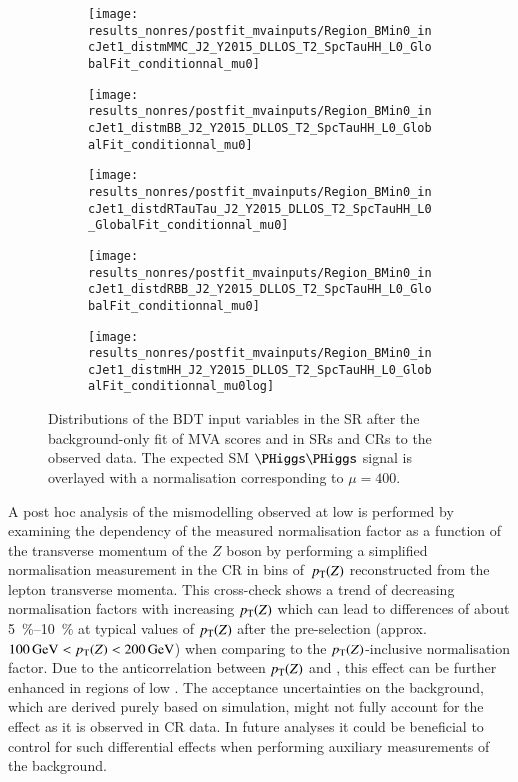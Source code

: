 \begin{figure}[htbp]
  \centering

  \begin{subfigure}{0.46\textwidth}
    \texttt{[image: results\_nonres/postfit\_mvainputs/Region\_BMin0\_incJet1\_distmMMC\_J2\_Y2015\_DLLOS\_T2\_SpcTauHH\_L0\_GlobalFit\_conditionnal\_mu0]}
  \end{subfigure}\hfill%
  \begin{subfigure}{0.46\textwidth}
    \texttt{[image: results\_nonres/postfit\_mvainputs/Region\_BMin0\_incJet1\_distmBB\_J2\_Y2015\_DLLOS\_T2\_SpcTauHH\_L0\_GlobalFit\_conditionnal\_mu0]}
  \end{subfigure}

  \begin{subfigure}{0.46\textwidth}
    \texttt{[image: results\_nonres/postfit\_mvainputs/Region\_BMin0\_incJet1\_distdRTauTau\_J2\_Y2015\_DLLOS\_T2\_SpcTauHH\_L0\_GlobalFit\_conditionnal\_mu0]}
  \end{subfigure}\hfill%
  \begin{subfigure}{0.46\textwidth}
    \texttt{[image: results\_nonres/postfit\_mvainputs/Region\_BMin0\_incJet1\_distdRBB\_J2\_Y2015\_DLLOS\_T2\_SpcTauHH\_L0\_GlobalFit\_conditionnal\_mu0]}
  \end{subfigure}

  \begin{subfigure}{0.46\textwidth}
    \texttt{[image: results\_nonres/postfit\_mvainputs/Region\_BMin0\_incJet1\_distmHH\_J2\_Y2015\_DLLOS\_T2\_SpcTauHH\_L0\_GlobalFit\_conditionnal\_mu0log]}
  \end{subfigure}

  \caption{Distributions of the BDT input variables in the \hadhad SR after the
    background-only fit of MVA scores and \mll in SRs and CRs to the observed
    data. The expected SM $\HH$ signal is overlayed with a normalisation
    corresponding to $\mu = 400$.}
  \label{fig:postfit_mva_inputs}
\end{figure}

A post hoc analysis of the mismodelling observed at low \dRtautau is performed
by examining the dependency of the measured \ZHF normalisation factor as a
function of the transverse momentum of the $Z$ boson by performing a simplified
normalisation measurement in the CR in bins of~$p_{\text{T}}(Z)$ reconstructed from the
lepton transverse momenta. This
cross-check shows a trend of decreasing \ZHF normalisation factors with
increasing $p_{\text{T}}(Z)$ which can lead to differences of about
\SIrange{5}{10}{\percent} at typical values of $p_{\text{T}}(Z)$ after the \hadhad
pre-selection (approx.\ $\SI{100}{\GeV} < \pT(Z) < \SI{200}{\GeV}$) when
comparing to the $p_{\text{T}}(Z)$-inclusive normalisation factor. Due to the
anticorrelation between $p_{\text{T}}(Z)$ and \dRtautau, this effect can be further
enhanced in regions of low \dRtautau. The acceptance uncertainties on the \ZHF
background, which are derived purely based on simulation, might not fully
account for the effect as it is observed in CR data. In future analyses it could
be beneficial to control for such differential effects when performing auxiliary
measurements of the \ZHF background.

